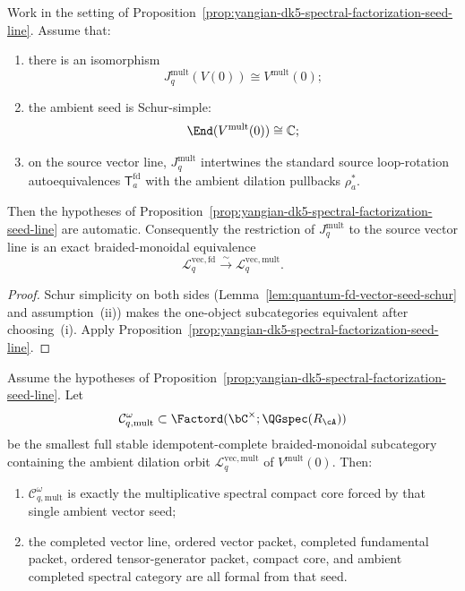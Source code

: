 \begin{corollary}
\label{cor:yangian-dk5-spectral-factorization-schur-seed-line}
Work in the setting of
Proposition~\ref{prop:yangian-dk5-spectral-factorization-seed-line}.
Assume that:
\begin{enumerate}[label=\textup{(\roman*)}]
\item there is an isomorphism
 \[
 J_q^{\mathrm{mult}}(V(0))\cong V^{\mathrm{mult}}(0);
 \]
\item the ambient seed is Schur-simple:
 \[
 \End(V^{\mathrm{mult}}(0))\cong \mathbb C;
 \]
\item on the source vector line,
 \(J_q^{\mathrm{mult}}\) intertwines the standard source loop-rotation
 autoequivalences \(\mathsf T_a^{\mathrm{fd}}\) with the ambient
 dilation pullbacks \(\rho_a^*\).
\end{enumerate}
Then the hypotheses of
Proposition~\ref{prop:yangian-dk5-spectral-factorization-seed-line}
are automatic. Consequently the restriction of \(J_q^{\mathrm{mult}}\)
to the source vector line is an exact braided-monoidal equivalence
\[
\mathcal L_q^{\mathrm{vec,fd}}
\xrightarrow{\sim}
\mathcal L_q^{\mathrm{vec,mult}}.
\]

\end{corollary}

\begin{proof}
Schur simplicity on both sides
(Lemma~\ref{lem:quantum-fd-vector-seed-schur} and
assumption~\textup{(ii)}) makes the one-object subcategories
equivalent after choosing~\textup{(i)}. Apply
Proposition~\ref{prop:yangian-dk5-spectral-factorization-seed-line}.
\end{proof}

\begin{corollary}
\label{cor:yangian-dk5-spectral-factorization-ambient-one-seed}
Assume the hypotheses of
Proposition~\ref{prop:yangian-dk5-spectral-factorization-seed-line}.
Let
\[
\mathcal C_{q,\mathrm{mult}}^\omega
\subset
\Factord(\bC^\times;\QGspec(R_{\cA}))
\]
be the smallest full stable idempotent-complete braided-monoidal
subcategory containing the ambient dilation orbit
\(\mathcal L_q^{\mathrm{vec,mult}}\) of \(V^{\mathrm{mult}}(0)\).
Then:
\begin{enumerate}[label=\textup{(\alph*)}]
\item \(\mathcal C_{q,\mathrm{mult}}^\omega\) is exactly the
 multiplicative spectral compact core forced by that single ambient
 vector seed;
\item the completed vector line, ordered vector packet, completed
 fundamental packet, ordered tensor-generator packet, compact core,
 and ambient completed spectral category are all formal from that
 seed.
\end{enumerate}

\end{corollary}

